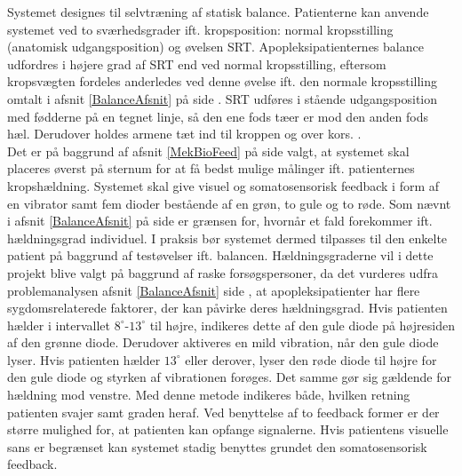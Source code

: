 Systemet designes til selvtræning af statisk balance. Patienterne kan anvende systemet ved to sværhedsgrader ift. kropsposition: normal kropsstilling (anatomisk udgangsposition) og øvelsen SRT. Apopleksipatienternes balance udfordres i højere grad af SRT end ved normal kropsstilling, eftersom kropsvægten fordeles anderledes ved denne øvelse ift. den normale kropsstilling omtalt i afsnit \ref{BalanceAfsnit} på side \pageref{BalanceAfsnit}. SRT udføres i stående udgangsposition med fødderne på en tegnet linje, så den ene fods tæer er mod den anden fods hæl. Derudover holdes armene tæt ind til kroppen og over kors. \cite{Huo1999}.\\ %
Det er på baggrund af afsnit \ref{MekBioFeed} på side \pageref{MekBioFeed} valgt, at systemet skal placeres øverst på sternum for at få bedst mulige målinger ift. patienternes kropshældning. Systemet skal give visuel og somatosensorisk feedback i form af en vibrator samt fem dioder bestående af en grøn, to gule og to røde. Som nævnt i afsnit \ref{BalanceAfsnit} på side \pageref{BalanceAfsnit} er grænsen for, hvornår et fald forekommer ift. hældningsgrad individuel. I praksis bør systemet dermed tilpasses til den enkelte patient på baggrund af testøvelser ift. balancen. Hældningsgraderne vil i dette projekt blive valgt på baggrund af raske forsøgspersoner, da det vurderes udfra problemanalysen afsnit \ref{BalanceAfsnit} side \pageref{BalanceAfsnit}, at apopleksipatienter har flere sygdomsrelaterede faktorer, der kan påvirke deres hældningsgrad. Hvis patienten hælder i intervallet $8^{\circ}$-$13^{\circ}$ til højre, indikeres dette af den gule diode på højresiden af den grønne diode. Derudover aktiveres en mild vibration, når den gule diode lyser. Hvis patienten hælder $13^{\circ}$ eller derover, lyser den røde diode til højre for den gule diode og styrken af vibrationen forøges. Det samme gør sig gældende for hældning mod venstre. Med denne metode indikeres både, hvilken retning patienten svajer samt graden heraf. Ved benyttelse af to feedback former er der større mulighed for, at patienten kan opfange signalerne. Hvis patientens visuelle sans er begrænset kan systemet stadig benyttes grundet den somatosensorisk feedback. \\ 
